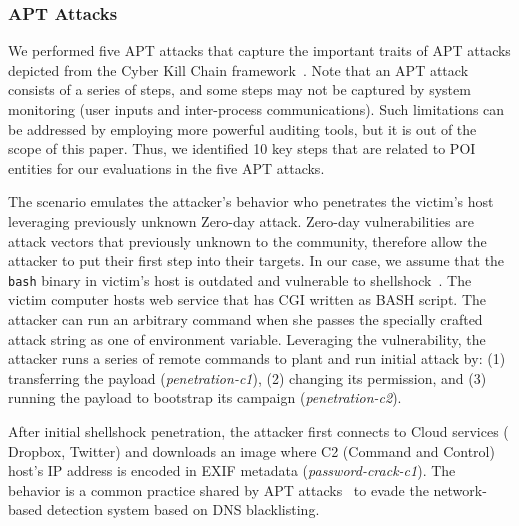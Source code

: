 \subsubsection{APT Attacks}
\label{subsubsec:attack-cases}

We performed five APT attacks that capture the important traits of APT attacks depicted from the Cyber Kill Chain framework~\cite{cyberkillchain}. 
Note that an APT attack consists of a series of steps, and some steps may not be captured by system monitoring (\eg user inputs and inter-process communications).
Such limitations can be addressed by employing more powerful auditing tools, but it is out of the scope of this paper.
Thus, we identified 10 key steps that are related to POI entities for our evaluations in the five APT attacks.


The scenario emulates the attacker's behavior who penetrates the victim's host
leveraging previously unknown Zero-day attack. Zero-day vulnerabilities are
attack vectors that previously unknown to the community, therefore allow the
attacker to put their first step into their targets. In our case, we assume that
the {\tt bash} binary in victim's host is outdated and vulnerable to shellshock~\cite{shellshock}. The victim computer hosts web service that has
CGI written as BASH script. The attacker can run an arbitrary command when she
passes the specially crafted attack string as one of environment variable. Leveraging the vulnerability, the attacker runs a series of remote commands to
plant and run initial attack by: (1) transferring the payload (\emph{penetration-c1}), (2) changing its permission, and (3) running the payload to bootstrap its campaign (\emph{penetration-c2}).


After initial shellshock penetration, the attacker first connects to Cloud services (\eg
Dropbox, Twitter) and downloads an image where C2 (Command and Control) host's IP address is encoded in EXIF metadata (\emph{password-crack-c1}). The behavior is a common practice shared by APT attacks~\cite{hammertoss,vpnfilter} to evade the network-based detection system based on DNS blacklisting.

